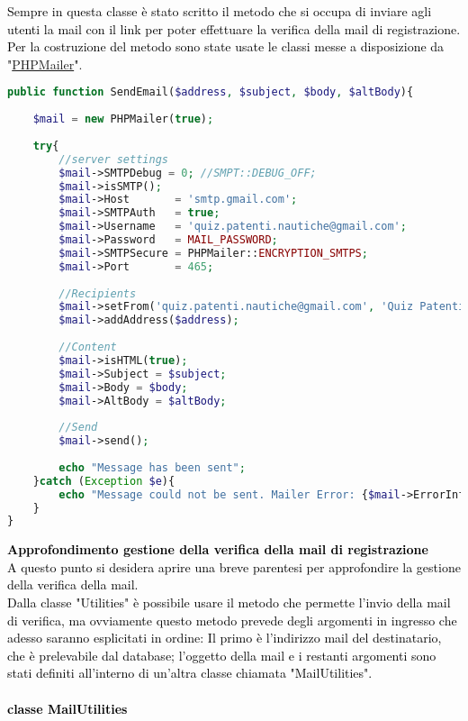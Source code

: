 \textcolor{black}{Sempre in questa classe è stato scritto il metodo che si occupa di inviare agli utenti la mail con il link per poter effettuare la verifica della mail di registrazione.\\
Per la costruzione del metodo sono state usate le classi messe a disposizione da "\href{https://github.com/PHPMailer/PHPMailer}{PHPMailer}"}.

\begin{lstlisting}[language=php]
public function SendEmail($address, $subject, $body, $altBody){
	
	$mail = new PHPMailer(true);
	
	try{
		//server settings
		$mail->SMTPDebug = 0; //SMPT::DEBUG_OFF;
		$mail->isSMTP();
		$mail->Host       = 'smtp.gmail.com';
		$mail->SMTPAuth   = true;
		$mail->Username   = 'quiz.patenti.nautiche@gmail.com';
		$mail->Password   = MAIL_PASSWORD;
		$mail->SMTPSecure = PHPMailer::ENCRYPTION_SMTPS;
		$mail->Port       = 465;
		
		//Recipients
		$mail->setFrom('quiz.patenti.nautiche@gmail.com', 'Quiz Patenti Nautiche');
		$mail->addAddress($address);
		
		//Content
		$mail->isHTML(true);
		$mail->Subject = $subject;
		$mail->Body = $body;
		$mail->AltBody = $altBody;
		
		//Send
		$mail->send();
		
		echo "Message has been sent";
	}catch (Exception $e){
		echo "Message could not be sent. Mailer Error: {$mail->ErrorInfo}";
	}
}
\end{lstlisting}

\textcolor{black}{
\textbf{Approfondimento gestione della verifica della mail di registrazione}\\
A questo punto si desidera aprire una breve parentesi per approfondire la gestione della verifica della mail.\\
Dalla classe "Utilities" è possibile usare il metodo che permette l'invio della mail di verifica, ma ovviamente questo metodo prevede degli argomenti in ingresso che adesso saranno esplicitati in ordine: Il primo è l'indirizzo mail del destinatario, che è prelevabile dal database; l'oggetto della mail e i restanti argomenti sono stati definiti all'interno di un'altra classe chiamata "MailUtilities".}\\

\paragraph{\textcolor{black}{classe MailUtilities}}\leavevmode\\


